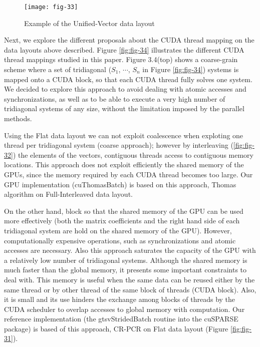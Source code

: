 \begin{figure}[htbp]
    \centering
    \texttt{[image: fig-33]}
    \caption{Example of the Unified-Vector data layout}
    \label{fig:fig-33}
\end{figure}

Next, we explore the different proposals about the CUDA thread mapping on the
data layouts above described. Figure \ref{fig:fig-34} illustrates the different CUDA thread mappings studied in this paper. Figure 3.4(top) shows a coarse-grain scheme where a set of
tridiagonal ($S_1$, $\cdots$, $S_n$ in Figure \ref{fig:fig-34}) systems
 is mapped onto a CUDA block, so that each CUDA thread fully solves one system. We decided to explore this approach to avoid
 dealing with atomic accesses and synchronizations, as well as to be able to execute a
 very high number of tridiagonal systems of any size, without the limitation imposed by
 the parallel methods.

 Using the Flat data layout we can not exploit coalescence when exploting one thread per tridiagonal
 system (coarse approach); however by interleaving (\ref{fig:fig-32}) the elements of the 
 vectors, contiguous threads access to contiguous memory locations. This approach does not
 exploit efficiently the shared memory of the GPUs, since the memory required by each
 CUDA thread becomes too large. Our GPU implementation (cuThomasBatch) is based on this approach,
 Thomas algorithm on Full-Interleaved data layout.

 On the other hand, block so that the shared memory of the GPU can be used more effectively (both the
 matrix coefficients and the right hand side of each tridiagonal system are hold on the
 shared memory of the GPU). However, computationally expensive operations, such as
 synchronizations and atomic accesses are necessary. Also this approach saturates the
 capacity of the GPU with a relatively low number of tridiagonal systems. Although the
 shared memory is much faster than the global memory, it presents some important 
 constraints to deal with. This memory is useful when the same data can be reused either by
 the same thread or by other thread of the same block of threads (CUDA block). Also,
 it is small and its use hinders the exchange
 among blocks of threads by the CUDA scheduler to overlap accesses to global memory
 with computation. Our reference implementation (the gtsvStridedBatch routine into
 the cuSPARSE package) is based of this approach, CR-PCR on Flat
 data layout (Figure \ref{fig:fig-31}).

